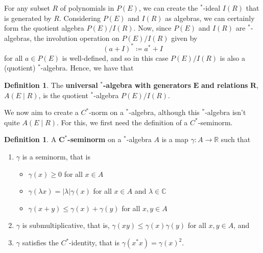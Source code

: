 \documentclass{article}
\theoremstyle{plain}
\theoremstyle{definition}
\newtheorem{definition}[theorem]{Definition}
\theoremstyle{remark}
\begin{document}
For any subset $R$ of polynomials in $P(E)$, 
we can create the $^*$-ideal
$I(R)$ that is generated by $R$.
Considering $P(E)$ and $I(R)$ as algebras, we can certainly form 
the quotient algebra $P(E)/I(R)$.
Now, since $P(E)$ and $I(R)$ are $^*$-algebras,
the involution operation on $P(E)/I(R)$ given by
\begin{equation}
	(a + I)^* \coloneqq a^* + I
\end{equation}
for all $a \in P(E)$ is well-defined, and so in this case
$P(E)/I(R)$ is also a (quotient) $^*$-algebra.
Hence, we have that
\begin{definition}
	The \textbf{universal} $\bm{^*}$\textbf{-algebra
	with generators} $\bm{E}$ \textbf{and relations} $\bm{R}$,
	$A(E \mid R)$,
	is the quotient $^*$-algebra 
	$P(E)/I(R)$.
\end{definition}



We now aim to create a $C^*$-norm on a $^*$-algebra,
although this $^*$-algebra isn't quite $A(E \mid R)$.
For this, we first need the definition of a $C^*$-seminorm.

\begin{definition}
	A $\bm{C^*}$\textbf{-seminorm} on a $^*$-algebra $A$
	is a map $\gamma : A \rightarrow \mathbb{R}$ such that 
	\begin{enumerate}
		\item $\gamma$ is a seminorm, that is
			\begin{itemize}
				\item $\gamma(x) \geq 0$ for all $x \in A$
				\item $\gamma(\lambda{x}) = \lvert \lambda \rvert \gamma(x)$ for all $x \in A$ and $\lambda \in \mathbb{C}$
				\item $\gamma(x + y) \leq \gamma(x) + \gamma(y)$ for all $x,y \in A$
			\end{itemize}
		\item $\gamma$ is submultiplicative, that is, 
			$\gamma(xy) \leq \gamma(x)\gamma(y)$ for all $x,y \in A$,
			and
		\item $\gamma$ satisfies the $C^*$-identity, that is
			$\gamma(x^*x) = \gamma(x)^2$.
	\end{enumerate}
\end{definition}
\end{document}
